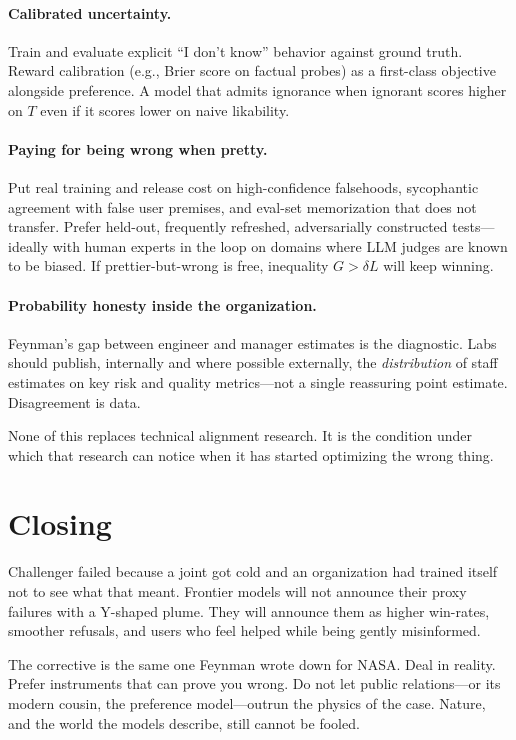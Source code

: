 \documentclass[11pt]{article}
\begin{document}
\paragraph{Calibrated uncertainty.}
Train and evaluate explicit ``I don't know'' behavior against ground truth. Reward calibration (e.g., Brier score on factual probes) as a first-class objective alongside preference. A model that admits ignorance when ignorant scores higher on \(T\) even if it scores lower on naive likability.

\paragraph{Paying for being wrong when pretty.}
Put real training and release cost on high-confidence falsehoods, sycophantic agreement with false user premises, and eval-set memorization that does not transfer. Prefer held-out, frequently refreshed, adversarially constructed tests---ideally with human experts in the loop on domains where LLM judges are known to be biased. If prettier-but-wrong is free, inequality \(G > \delta L\) will keep winning.

\paragraph{Probability honesty inside the organization.}
Feynman's gap between engineer and manager estimates is the diagnostic. Labs should publish, internally and where possible externally, the \emph{distribution} of staff estimates on key risk and quality metrics---not a single reassuring point estimate. Disagreement is data.

None of this replaces technical alignment research. It is the condition under which that research can notice when it has started optimizing the wrong thing.

\section*{Closing}

Challenger failed because a joint got cold and an organization had trained itself not to see what that meant. Frontier models will not announce their proxy failures with a Y-shaped plume. They will announce them as higher win-rates, smoother refusals, and users who feel helped while being gently misinformed.

The corrective is the same one Feynman wrote down for NASA. Deal in reality. Prefer instruments that can prove you wrong. Do not let public relations---or its modern cousin, the preference model---outrun the physics of the case. Nature, and the world the models describe, still cannot be fooled.
\end{document}
